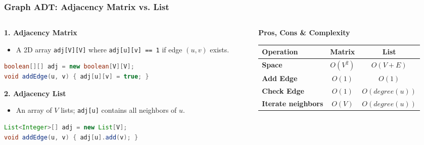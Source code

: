 \documentclass[8pt,aspectratio=169]{beamer}
\begin{document}
\begin{frame}[t, fragile]
\frametitle{Graph ADT: Adjacency Matrix vs. List}

\begin{columns}[T]
    \begin{column}{0.5\textwidth}
        \textbf{1. Adjacency Matrix}
        \begin{itemize}
            \item A 2D array \texttt{adj[V][V]} where \texttt{adj[u][v] == 1} if edge $(u,v)$ exists.
        \end{itemize}
        \begin{lstlisting}[language=Java, basicstyle=\tiny\ttfamily, frame=leftline]
boolean[][] adj = new boolean[V][V];
void addEdge(u, v) { adj[u][v] = true; }
        \end{lstlisting}

        \vspace{0.2cm}
        \textbf{2. Adjacency List}
        \begin{itemize}
            \item An array of $V$ lists; \texttt{adj[u]} contains all neighbors of $u$.
        \end{itemize}
        \begin{lstlisting}[language=Java, basicstyle=\tiny\ttfamily, frame=leftline]
List<Integer>[] adj = new List[V];
void addEdge(u, v) { adj[u].add(v); }
        \end{lstlisting}
    \end{column}

    \begin{column}{0.5\textwidth}
        \textbf{Pros, Cons \& Complexity}
        
        \vspace{0.1cm}
        \scriptsize
        \renewcommand{\arraystretch}{1.3}
        \begin{tabular}{|l|c|c|}
        \hline
        \textbf{Operation} & \textbf{Matrix} & \textbf{List} \\ \hline
        \textbf{Space} & $O(V^2)$ & $O(V + E)$ \\ \hline
        \textbf{Add Edge} & $O(1)$ & $O(1)$ \\ \hline
        \textbf{Check Edge} & $O(1)$ & $O(degree(u))$ \\ \hline
        \textbf{Iterate neighbors} & $O(V)$ & $O(degree(u))$ \\ \hline
        \end{tabular}


\end{column}
\end{columns}
\end{frame}
\end{document}
